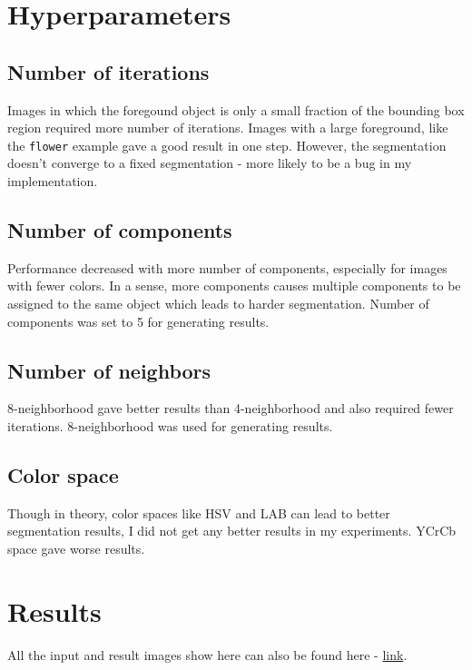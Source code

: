 \documentclass[a4paper,11]{article}
\begin{document}
     
\section{Hyperparameters}
\subsection{Number of iterations}
Images in which the foregound object is only a small fraction of the bounding box region required more number of iterations. Images with a large foreground, like the \texttt{flower} example gave a good result in one step. However, the segmentation doesn't converge to a fixed segmentation - more likely to be a bug in my implementation.

\subsection{Number of components}
Performance decreased with more number of components, especially for images with fewer colors. In a sense, more components causes multiple components to be assigned to the same object which leads to harder segmentation. Number of components was set to 5 for generating results.

\subsection{Number of neighbors}
8-neighborhood gave better results than 4-neighborhood and also required fewer iterations. 8-neighborhood was used for generating results.

\subsection{Color space}
Though in theory, color spaces like HSV and LAB can lead to better segmentation results, I did not get any better results in my experiments. YCrCb space gave worse results.
  
\section{Results}
All the input and result images show here can also be found here - \href{https://drive.google.com/drive/folders/1ctn--zOvO0Ccc5qZbPCyCRNH6bSbNcWa?usp=sharing}{link}.
  
\end{document}
